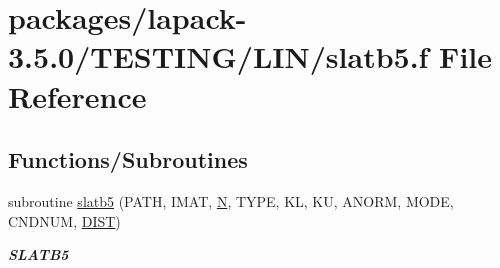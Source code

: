 \hypertarget{slatb5_8f}{}\section{packages/lapack-\/3.5.0/\+T\+E\+S\+T\+I\+N\+G/\+L\+I\+N/slatb5.f File Reference}
\label{slatb5_8f}
\subsection*{Functions/\+Subroutines}
\begin{DoxyCompactItemize}
\item 
subroutine \hyperlink{group__single__lin_gaf19f8d70411c78c54ead5538ccb2cf3d}{slatb5} (P\+A\+T\+H, I\+M\+A\+T, \hyperlink{polmisc_8c_a0240ac851181b84ac374872dc5434ee4}{N}, T\+Y\+P\+E, K\+L, K\+U, A\+N\+O\+R\+M, M\+O\+D\+E, C\+N\+D\+N\+U\+M, \hyperlink{superlu__enum__consts_8h_af00a42ecad444bbda75cde1b64bd7e72ac04fbbdf0d80a4ad25e565541deeebd7}{D\+I\+S\+T})
\begin{DoxyCompactList}\small\item\em {\bfseries S\+L\+A\+T\+B5} \end{DoxyCompactList}\end{DoxyCompactItemize}
